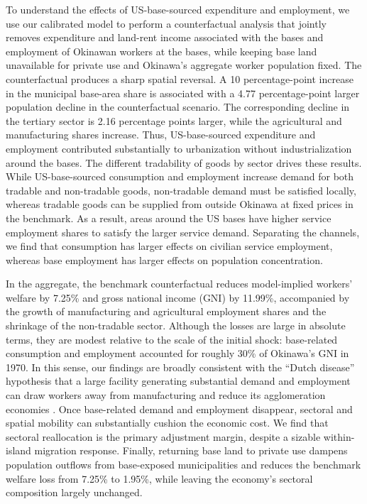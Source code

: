 \documentclass[12pt, unicode, a4paper]{article}
\newcommand{\1}{\mbox{1}\hspace{-0.25em}\mbox{l}} %
\begin{document}
To understand the effects of US-base-sourced expenditure and employment, we use our calibrated model to perform a counterfactual analysis that jointly removes expenditure and land-rent income associated with the bases and employment of Okinawan workers at the bases, while keeping base land unavailable for private use and Okinawa's aggregate worker population fixed.
The counterfactual produces a sharp spatial reversal. A 10 percentage-point increase in the municipal base-area share is associated with a 4.77 percentage-point larger population decline in the counterfactual scenario. The corresponding decline in the  tertiary sector is 2.16 percentage points larger, while the agricultural and manufacturing shares increase. Thus, US-base-sourced expenditure and employment contributed substantially to urbanization without industrialization around the bases. 
The different tradability of goods by sector drives these results. While US-base-sourced consumption and employment increase demand for both tradable and non-tradable goods, non-tradable demand must be satisfied locally, whereas tradable goods can be supplied from outside Okinawa at fixed prices in the benchmark. As a result, areas around the US bases have higher service employment shares to satisfy the larger service demand. Separating the channels, we find that consumption has larger effects on civilian service employment, whereas base employment has larger effects on population concentration. 

In the aggregate, the benchmark counterfactual reduces model-implied workers' welfare by 7.25\% and gross national income (GNI) by 11.99\%, accompanied by the growth of manufacturing and agricultural employment shares and the shrinkage of the non-tradable sector.
Although the losses are large in absolute terms, they are modest relative to the scale of the initial shock: base-related consumption and employment accounted for roughly 30\% of Okinawa's GNI in 1970. In this sense, our findings are broadly consistent with the ``Dutch disease'' hypothesis that a large facility generating substantial demand and employment can draw workers away from manufacturing and reduce its agglomeration economies \citep{gollin2016urbanization,allcott2018dutch}. Once base-related demand and employment disappear, sectoral and spatial mobility can substantially cushion the economic cost. We find that sectoral reallocation is the primary adjustment margin, despite a sizable within-island migration response. Finally, returning base land to private use dampens population outflows from base-exposed municipalities and reduces the benchmark welfare loss from 7.25\% to 1.95\%, while leaving the economy's sectoral composition largely unchanged.
\end{document}
